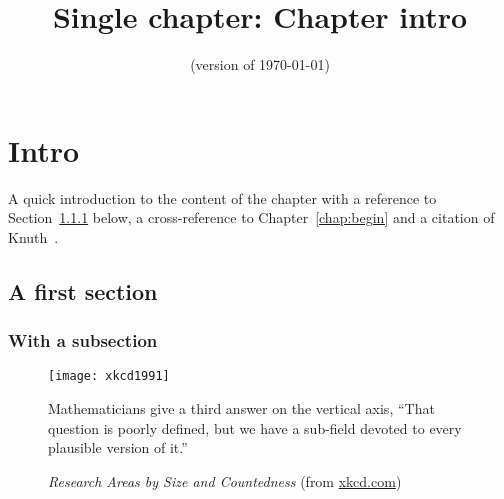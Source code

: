 \documentclass[../thesis]{subfiles}
\title{Single chapter: Chapter intro} \author{}
\date{(version of \today)}
\begin{document}
\ifSubfilesClassLoaded{ 
	\setcounter{chapter}{0} 
	\maketitle \tableofcontents \listoffigures \listoftodos
	}{}

\chapter{Intro}
A quick introduction to the content of the chapter with a reference to Section~\ref{sec:in:sub} below, a cross-reference to Chapter~\ref{chap:begin} and a citation of Knuth~\cite{texbook}.

\section{A first section}
\subsection{With a subsection}\label{sec:in:sub}
\begin{figure}[h]
\centering
\caption{\textit{Research Areas by Size and Countedness} (from \href{https://xkcd.com/1991}{xkcd.com})}
\texttt{[image: xkcd1991]}\\[.1em] %
\begin{minipage}{.68\textwidth}
\ttfamily\footnotesize 
Mathematicians give a third answer on the vertical axis, ``That question is poorly defined, but we have a sub-field devoted to every plausible version of it.''
\end{minipage}
\end{figure}
\hfill \AG

\ifSubfilesClassLoaded{ 
  \printbibliography[heading=bibintoc, title=References]
  }{}
\end{document}
